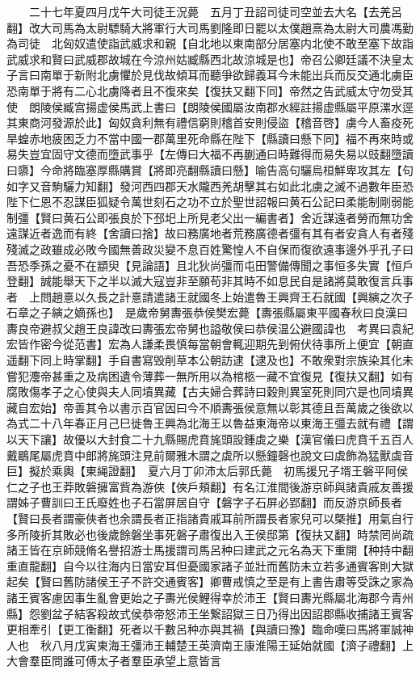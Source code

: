 　　二十七年夏四月戊午大司徒王況薨　五月丁丑詔司徒司空並去大名【去羌呂翻】改大司馬為太尉驃騎大將軍行大司馬劉隆即日罷以太僕趙熹為太尉大司農馮勤為司徒　北匈奴遣使詣武威求和親【自北地以東南部分居塞内北使不敢至塞下故詣武威求和賢曰武威郡故城在今涼州姑臧縣西北故涼城是也】帝召公卿廷議不決皇太子言曰南單于新附北虜懼於見伐故傾耳而聽爭欲歸義耳今未能出兵而反交通北虜臣恐南單于將有二心北虜降者且不復來矣【復扶又翻下同】帝然之告武威太守勿受其使　朗陵侯臧宫揚虚侯馬武上書曰【朗陵侯國屬汝南郡水經註揚虚縣屬平原漯水逕其東商河發源於此】匈奴貪利無有禮信窮則稽首安則侵盜【稽音啓】虜今人畜疫死旱蝗赤地疲困乏力不當中國一郡萬里死命縣在陛下【縣讀曰懸下同】福不再來時或易失豈宜固守文德而墮武事乎【左傳曰大福不再蒯通曰時難得而易失易以豉翻墮讀曰隳】今命將臨塞厚縣購賞【將即亮翻縣讀曰懸】喻告高句驪烏桓鮮卑攻其左【句如字又音駒驪力知翻】發河西四郡天水隴西羌胡擊其右如此北虜之滅不過數年臣恐陛下仁恩不忍謀臣狐疑令萬世刻石之功不立於聖世詔報曰黄石公記曰柔能制剛弱能制彊【賢曰黄石公即張良於下邳圯上所見老父出一編書者】舍近謀遠者勞而無功舍遠謀近者逸而有終【舍讀曰捨】故曰務廣地者荒務廣德者彊有其有者安貪人有者殘殘滅之政雖成必敗今國無善政災變不息百姓驚惶人不自保而復欲遠事邊外乎孔子曰吾恐季孫之憂不在顓臾【見論語】且北狄尚彊而屯田警備傳聞之事恒多失實【恒戶登翻】誠能舉天下之半以滅大寇豈非至願苟非其時不如息民自是諸將莫敢復言兵事者　上問趙憙以久長之計憙請遣諸王就國冬上始遣魯王興齊王石就國【興縯之次子石章之子縯之嫡孫也】　是歲帝舅夀張恭侯樊宏薨【夀張縣屬東平國春秋曰良漢曰夀良帝避叔父趙王良諱改曰夀張宏帝舅也謚敬侯曰恭侯温公避國諱也　考異曰袁紀宏皆作密今從范書】宏為人謙柔畏慎每當朝會輒迎期先到俯伏待事所上便宜【朝直遥翻下同上時掌翻】手自書寫毁削草本公朝訪逮【逮及也】不敢衆對宗族染其化未嘗犯灋帝甚重之及病困遺令薄葬一無所用以為棺柩一藏不宜復見【復扶又翻】如有腐敗傷孝子之心使與夫人同墳異藏【古夫婦合葬詩曰穀則異室死則同穴是也同墳異藏自宏始】帝善其令以書示百官因曰今不順夀張侯意無以彰其德且吾萬歲之後欲以為式二十八年春正月己巳徙魯王興為北海王以魯益東海帝以東海王彊去就有禮【謂以天下讓】故優以大封食二十九縣賜虎賁旄頭設鍾虡之樂【漢官儀曰虎賁千五百人戴鶡尾屬虎賁中郎將旄頭注見前爾雅木謂之虡所以懸鐘磬也說文曰虡飾為猛獸虡音巨】擬於乘輿【東䋲證翻】　夏六月丁卯沛太后郭氏薨　初馬援兄子壻王磐平阿侯仁之子也王莽敗磐擁富貲為游俠【俠戶頰翻】有名江淮間後游京師與諸貴戚友善援謂姊子曹訓曰王氏廢姓也子石當屏居自守【磐字子石屏必郢翻】而反游京師長者【賢曰長者謂豪俠者也余謂長者正指諸貴戚耳前所謂長者家兒可以槩推】用氣自行多所陵折其敗必也後歲餘磐坐事死磐子肅復出入王侯邸第【復扶又翻】時禁罔尚疏諸王皆在京師競脩名譽招游士馬援謂司馬呂种曰建武之元名為天下重開【种持中翻重直龍翻】自今以往海内日當安耳但憂國家諸子並壯而舊防未立若多通賓客則大獄起矣【賢曰舊防諸侯王子不許交通賓客】卿曹戒慎之至是有上書告肅等受誅之家為諸王賓客慮因事生亂會更始之子夀光侯鯉得幸於沛王【賢曰夀光縣屬北海郡今青州縣】怨劉盆子結客殺故式侯恭帝怒沛王坐繋詔獄三日乃得出因詔郡縣收捕諸王賓客更相牽引【更工衡翻】死者以千數呂种亦與其禍【與讀曰豫】臨命嘆曰馬將軍誠神人也　秋八月戊寅東海王彊沛王輔楚王英濟南王康淮陽王延始就國【濟子禮翻】上大會羣臣問誰可傅太子者羣臣承望上意皆言

